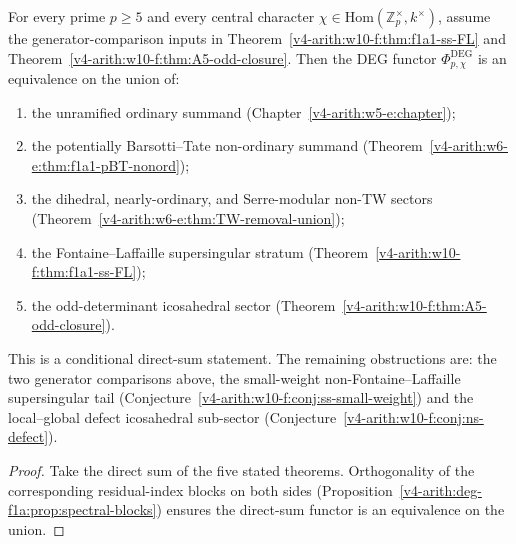 \begin{theorem}
\label{v4-arith:w10-f:thm:f1a1-maximal-w10f}
For every prime \(p\geq 5\) and every central
character \(\chi\in\mathrm{Hom}(\mathbb{Z}_{p}^{\times},k^{\times})\),
assume the generator-comparison inputs in
Theorem~\ref{v4-arith:w10-f:thm:f1a1-ss-FL} and
Theorem~\ref{v4-arith:w10-f:thm:A5-odd-closure}. Then
the DEG functor \(\Phi^{\mathrm{DEG}}_{p,\chi}\) is an equivalence on
the union of:
\begin{enumerate}
\item the unramified ordinary summand (Chapter~\ref{v4-arith:w5-e:chapter});
\item the potentially Barsotti--Tate non-ordinary summand
(Theorem~\ref{v4-arith:w6-e:thm:f1a1-pBT-nonord});
\item the dihedral, nearly-ordinary, and Serre-modular non-TW sectors
(Theorem~\ref{v4-arith:w6-e:thm:TW-removal-union});
\item the Fontaine--Laffaille supersingular stratum
(Theorem~\ref{v4-arith:w10-f:thm:f1a1-ss-FL});
\item the odd-determinant icosahedral sector
(Theorem~\ref{v4-arith:w10-f:thm:A5-odd-closure}).
\end{enumerate}
This is a conditional direct-sum statement. The remaining obstructions are:
the two generator comparisons above,
the small-weight non-Fontaine--Laffaille supersingular tail
(Conjecture~\ref{v4-arith:w10-f:conj:ss-small-weight}) and the
local--global defect icosahedral sub-sector
(Conjecture~\ref{v4-arith:w10-f:conj:ns-defect}).
\end{theorem}

\begin{proof}
Take the direct sum of the five stated theorems. Orthogonality of the corresponding
residual-index blocks on both sides
(Proposition~\ref{v4-arith:deg-f1a:prop:spectral-blocks}) ensures the direct-sum
functor is an equivalence on the union.
\end{proof}

